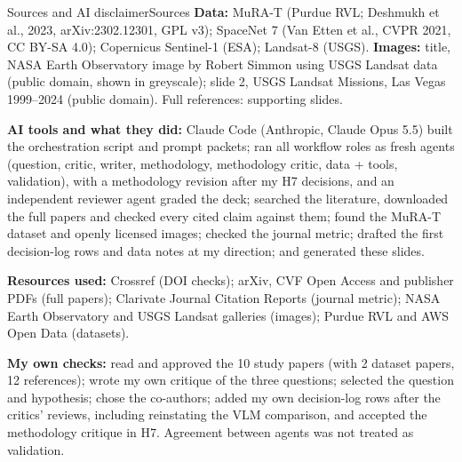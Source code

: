 \documentclass[aspectratio=169,11pt]{beamer}
\newcommand{\graticule}{%
  \foreach \x in {0,1.6,...,16.4} \draw[white,opacity=0.06,line width=0.4pt] ([xshift=\x cm]current page.south west) -- ([xshift=\x cm]current page.north west);
  \foreach \y in {0,1.6,...,9.6} \draw[white,opacity=0.06,line width=0.4pt] ([yshift=\y cm]current page.south west) -- ([yshift=\y cm]current page.south east);}
\begin{document}
\begin{frame}[shrink=18]{Sources and AI disclaimer}{Sources}
\footnotesize
\textbf{Data:} MuRA-T (Purdue RVL; Deshmukh et al., 2023, arXiv:2302.12301, GPL v3); SpaceNet 7 (Van Etten et al., CVPR 2021, CC BY-SA 4.0); Copernicus Sentinel-1 (ESA); Landsat-8 (USGS). \textbf{Images:} title, NASA Earth Observatory image by Robert Simmon using USGS Landsat data (public domain, shown in greyscale); slide 2, USGS Landsat Missions, Las Vegas 1999--2024 (public domain). Full references: supporting slides.

\vspace{6pt}
\textbf{AI tools and what they did:} Claude Code (Anthropic, Claude Opus 5.5) built the orchestration script and prompt packets; ran all workflow roles as fresh agents (question, critic, writer, methodology, methodology critic, data + tools, validation), with a methodology revision after my H7 decisions, and an independent reviewer agent graded the deck; searched the literature, downloaded the full papers and checked every cited claim against them; found the MuRA-T dataset and openly licensed images; checked the journal metric; drafted the first decision-log rows and data notes at my direction; and generated these slides.

\vspace{4pt}
\textbf{Resources used:} Crossref (DOI checks); arXiv, CVF Open Access and publisher PDFs (full papers); Clarivate Journal Citation Reports (journal metric); NASA Earth Observatory and USGS Landsat galleries (images); Purdue RVL and AWS Open Data (datasets).

\vspace{6pt}
\textbf{My own checks:} read and approved the 10 study papers (with 2 dataset papers, 12 references); wrote my own critique of the three questions; selected the question and hypothesis; chose the co-authors; added my own decision-log rows after the critics' reviews, including reinstating the VLM comparison, and accepted the methodology critique in H7. Agreement between agents was not treated as validation.
\end{frame}

\begin{frame}[plain]
\end{frame}
\end{document}
